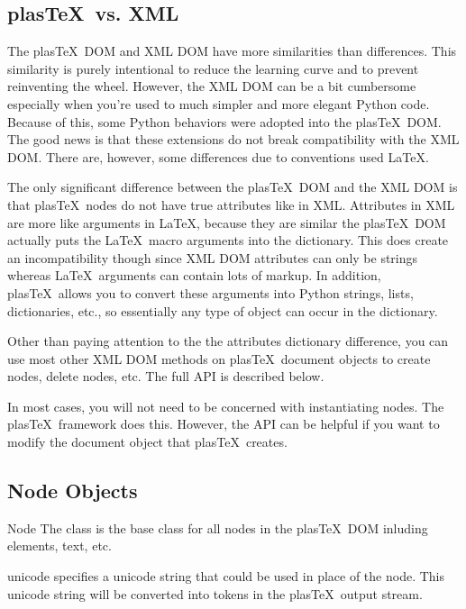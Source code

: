 \documentclass{manual}
\newcommand{\plasTeX}{plas\TeX}
\begin{document}
\subsection{\plasTeX\ vs. XML}

The \plasTeX\ DOM and XML DOM have more similarities than differences.
This similarity is purely intentional to reduce the learning curve and
to prevent reinventing the wheel.  However, the XML DOM can be a bit 
cumbersome especially when you're used to much simpler and more elegant
Python code.  Because of this, some Python behaviors were adopted into
the \plasTeX\ DOM.  The good news is that these extensions do not break
compatibility with the XML DOM.  There are, however, some differences 
due to conventions used \LaTeX.  

The only significant difference between the \plasTeX\ DOM and the XML DOM is 
that \plasTeX\ nodes do not have true attributes like in XML.  Attributes in XML
are more like arguments in \LaTeX, because they are similar the \plasTeX\
DOM actually puts the \LaTeX\ macro arguments into the 
dictionary.  This does create an incompatibility though since XML DOM
attributes can only be strings whereas \LaTeX\ arguments can contain 
lots of markup.  In addition, \plasTeX\ allows you to convert these 
arguments into Python strings, lists, dictionaries, etc., so essentially
any type of object can occur in the \member{attributes} dictionary.

Other than paying attention to the the attributes dictionary difference,
you can use most other XML DOM methods on \plasTeX\ document objects to
create nodes, delete nodes, etc.  The full API is described below.

In most cases, you will not need to be concerned with instantiating nodes.
The \plasTeX\ framework does this.  However, the API can be helpful if you
want to modify the document object that \plasTeX\ creates.


\subsection{Node Objects}

\begin{classdesc}{Node}{}
The  class is the base class for all nodes in the
\plasTeX\ DOM inluding elements, text, etc.
\end{classdesc}

\begin{memberdesc}[Node]{unicode}
specifies a unicode string that could be used in place of the node.
This unicode string will be converted into tokens in the \plasTeX\ 
output stream.
\end{memberdesc}
\end{document}
